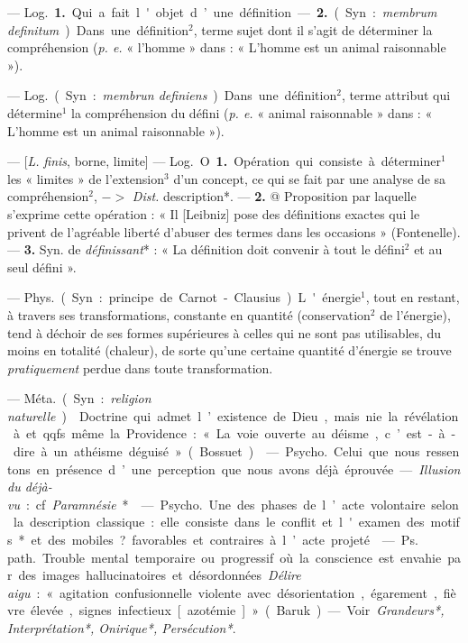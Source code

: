 \begin{itemize}[leftmargin=1cm, label=, itemsep=1pt]
 — \si{Log.} {\bf 1.} Qui a fait l'objet
d’une définition. — {\bf 2.} (Syn. : {\it membrum definitum}). Dans une définition$^2$, terme sujet dont il s’agit de
déterminer la compréhension ({\it p. e.}
« l'homme » dans : « L'homme est un
animal raisonnable »).

 — \si{Log.} (Syn. : {\it membrun
definiens}). Dans une définition$^2$,
terme attribut qui détermine$^1$ la
compréhension du défini ({\it p. e.} « animal raisonnable » dans : « L’homme
est un animal raisonnable »).

 — [{\it L.} {\it finis}, borne, limite]
— \si{Log.} O {\bf 1.} Opération qui consiste à
déterminer$^1$ les « limites » de l’extension$^3$ d’un concept, ce qui se fait par
une analyse de sa compréhension$^2$,
$->$ {\it Dist.} description*. — {\bf 2.} @ Proposition par laquelle s’exprime cette
opération : « Il [Leibniz] pose des
définitions exactes qui le privent de
l’agréable liberté d’abuser des termes
dans les occasions » (Fontenelle). —
 {\bf 3.} Syn. de {\it définissant}* : « La définition doit convenir à tout le défini$^2$
et au seul défini ».

 — \si{Phys.}
(Syn. : principe de Carnot-Clausius).
L'énergie$^1$, tout en restant, à travers ses transformations, constante
en quantité (conservation$^2$ de l’énergie), tend à déchoir de ses formes
supérieures à celles qui ne sont pas
utilisables, du moins en totalité
(chaleur), de sorte qu’une certaine
quantité d'énergie se trouve {\it pratiquement} perdue dans toute transformation.

 — \si{Méta.} (Syn. : {\it religion naturelle}).  Doctrine qui admet l’existence de Dieu, mais nie la révélation
à et qqfs. même la Providence : « La
voie ouverte au déisme, c’est-à-dire
à un athéisme déguisé » (Bossuet).

 — \si{Psycho.}
Celui que nous ressentons en présence d’une perception que nous
avons déjà éprouvée. — {\it Illusion du
déjà-vu} : cf. {\it Paramnésie}*.

 — \si{Psycho.} Une des
phases de l’acte volontaire selon la
description classique : elle consiste 
dans le conflit et l'examen des motifs* et des mobiles? favorables et
contraires à l’acte projeté.

 — \si{Ps. path.} Trouble mental
temporaire ou progressif où la conscience est envahie par des images
hallucinatoires et désordonnées. {\it Délire aigu} : « agitation confusionnelle
violente avec désorientation, égarement, fièvre élevée, signes infectieux [azotémie] » (Baruk). — Voir
{\it Grandeurs*, Interprétation*, Onirique*, Persécution*}.


\end{itemize}
